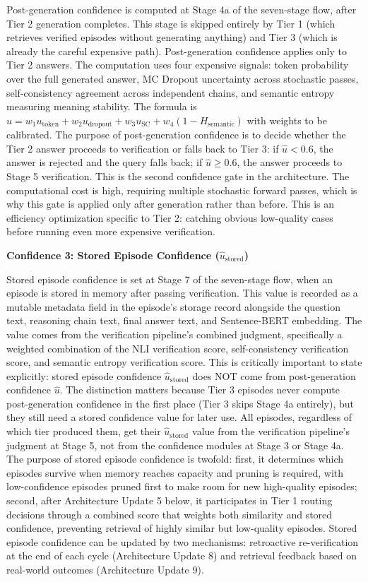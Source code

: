 \documentclass[11pt,a4paper]{article}
\newcommand{\uhat}{\hat{u}}
\newcommand{\ustored}{\hat{u}_{\text{stored}}}
\begin{document}
{Post-generation confidence is computed at Stage 4a of the seven-stage flow, after Tier 2 generation completes. This stage is skipped entirely by Tier 1 (which retrieves verified episodes without generating anything) and Tier 3 (which is already the careful expensive path). Post-generation confidence applies only to Tier 2 answers. The computation uses four expensive signals: token probability over the full generated answer, MC Dropout uncertainty across stochastic passes, self-consistency agreement across independent chains, and semantic entropy measuring meaning stability. The formula is $\uhat = w_1 u_{\text{token}} + w_2 u_{\text{dropout}} + w_3 u_{\text{SC}} + w_4(1 - H_{\text{semantic}})$ with weights to be calibrated. The purpose of post-generation confidence is to decide whether the Tier 2 answer proceeds to verification or falls back to Tier 3: if $\uhat < 0.6$, the answer is rejected and the query falls back; if $\uhat \geq 0.6$, the answer proceeds to Stage 5 verification. This is the second confidence gate in the architecture. The computational cost is high, requiring multiple stochastic forward passes, which is why this gate is applied only after generation rather than before. This is an efficiency optimization specific to Tier 2: catching obvious low-quality cases before running even more expensive verification.

\textbf{Confidence 3: Stored Episode Confidence ($\ustored$)}

Stored episode confidence is set at Stage 7 of the seven-stage flow, when an episode is stored in memory after passing verification. This value is recorded as a mutable metadata field in the episode's storage record alongside the question text, reasoning chain text, final answer text, and Sentence-BERT embedding. The value comes from the verification pipeline's combined judgment, specifically a weighted combination of the NLI verification score, self-consistency verification score, and semantic entropy verification score. This is critically important to state explicitly: stored episode confidence $\ustored$ does NOT come from post-generation confidence $\uhat$. The distinction matters because Tier 3 episodes never compute post-generation confidence in the first place (Tier 3 skips Stage 4a entirely), but they still need a stored confidence value for later use. All episodes, regardless of which tier produced them, get their $\ustored$ value from the verification pipeline's judgment at Stage 5, not from the confidence modules at Stage 3 or Stage 4a. The purpose of stored episode confidence is twofold: first, it determines which episodes survive when memory reaches capacity and pruning is required, with low-confidence episodes pruned first to make room for new high-quality episodes; second, after Architecture Update 5 below, it participates in Tier 1 routing decisions through a combined score that weights both similarity and stored confidence, preventing retrieval of highly similar but low-quality episodes. Stored episode confidence can be updated by two mechanisms: retroactive re-verification at the end of each cycle (Architecture Update 8) and retrieval feedback based on real-world outcomes (Architecture Update 9).

}
\end{document}
